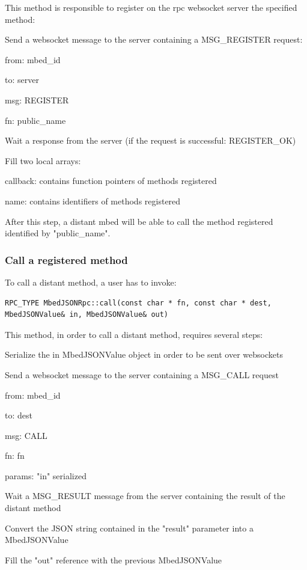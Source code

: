 \documentclass[pdftex,10pt,a4paper]{report}
\newenvironment{packed_item}{
\begin{itemize}
  \setlength{\itemsep}{1pt}
  \setlength{\parskip}{0pt}
  \setlength{\parsep}{0pt}
}{\end{itemize}}
\begin{document}
This method is responsible to register on the rpc websocket server the specified method:
\begin{packed_item}
	\item Send a websocket message to the server containing a MSG\_REGISTER request:
	\begin{packed_item}
		\item from: mbed\_id
		\item to: server
		\item msg: REGISTER
		\item fn: public\_name 
	\end{packed_item}
	\item Wait a response from the server (if the request is successful: REGISTER\_OK)
	\item Fill two local arrays:
	\begin{packed_item}
		\item callback: contains function pointers of methods registered
		\item name: contains identifiers of methods registered
	\end{packed_item}
\end{packed_item}


After this step, a distant mbed will be able to call the method registered identified by "public\_name".
    
\subsubsection{Call a registered method}
To call a distant method, a user has to invoke:
\begin{lstlisting}[label=Call a distant method,caption=Call a distant method]
RPC_TYPE MbedJSONRpc::call(const char * fn, const char * dest, MbedJSONValue& in, MbedJSONValue& out)
\end{lstlisting}

This method, in order to call a distant method, requires several steps:
\begin{packed_item}
	\item Serialize the in MbedJSONValue object in order to be sent over websockets
	\item Send a websocket message to the server containing a MSG\_CALL request
	\begin{packed_item}
		\item from: mbed\_id
		\item to: dest
		\item msg: CALL
		\item fn: fn
		\item params: "in" serialized
	\end{packed_item}
	\item Wait a MSG\_RESULT message from the server containing the result of the distant method
	\item Convert the JSON string contained in the "result" parameter into a MbedJSONValue
	\item Fill the "out" reference with the previous MbedJSONValue
\end{packed_item}
\end{document}
